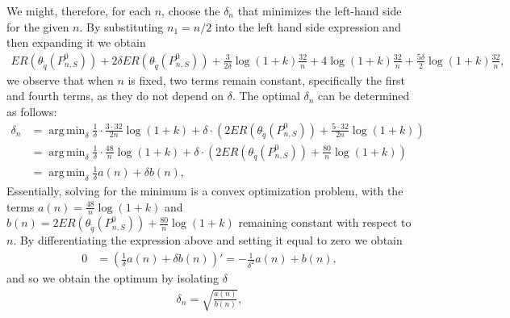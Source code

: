 \documentclass[11pt, a4paper]{article}
\DeclareMathOperator*{\argmin}{arg\,min}
\theoremstyle{definition}
\theoremstyle{remark}
\newcommand{\q}{q}
\newcommand{\btheta}{\theta}
\begin{document}
We might, therefore, for each $ n $, choose the $ \delta_n $ that minimizes the left-hand side for the given $ n $. By substituting $ n_1 = n/2 $ into the left hand side expression and then expanding it we obtain 
\begin{align*}
 ER(\btheta_{ \tilde{\q}}(P_{n,S}^{0})) + 2 \delta ER(\btheta_{ \tilde{\q}}(P_{n,S}^{0})) +\frac{3}{2\delta}\log (1 +k) \frac{32}{n} + 4\log (1 +k) \frac{32}{n} + \frac{5\delta}{2} \log (1 +k)   \frac{32}{n},
\end{align*}
we observe that when $n$ is fixed, two terms remain constant, specifically the first and fourth terms, as they do not depend on $\delta$. The optimal $\delta_n$ can be determined as follows:
\begin{align*}
    \delta_n &= \argmin_{\delta} \frac{1}{\delta} \cdot \frac{3 \cdot 32}{2n} \log(1 + k) + \delta \cdot \left(2ER(\btheta_{ \tilde{\q} }(P_{n, S}^{0})) + \frac{5 \cdot 32}{2n} \log(1 + k) \right) \\
    &= \argmin_{\delta} \frac{1}{\delta} \cdot \frac{48}{n} \log(1 + k) + \delta \cdot \left(2ER(\btheta_{ \tilde{\q} }(P_{n, S}^{0})) + \frac{80}{n} \log(1 + k) \right) \\
    &= \argmin_{\delta} \frac{1}{\delta} a(n) + \delta b(n),
\end{align*}
Essentially, solving for the minimum is a convex optimization problem, with the terms $a(n) = \frac{48}{n} \log(1 + k)$ and $b(n) = 2ER(\btheta_{ \tilde{\q} }(P_{n, S}^{0})) + \frac{80}{n} \log(1 + k)$ remaining constant with respect to $n$. By differentiating the expression above and setting it equal to zero we obtain 
\begin{align*}
    0 &= \left( \frac{1}{\delta} a(n) + \delta b(n) \right)' = - \frac{1}{\delta^2} a(n) + b(n),
\end{align*}
and so we obtain the optimum by isolating $ \delta $ 
\begin{align*}
    \delta_n = \sqrt{\frac{a(n)}{b(n)}},
\end{align*}
\end{document}
